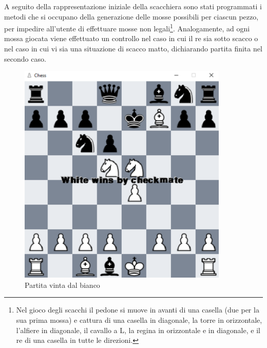 \newpage

A seguito della rappresentazione iniziale della scacchiera sono stati programmati i metodi che si occupano della generazione delle mosse possibili per ciascun pezzo, per impedire all'utente di effettuare mosse non legali\footnote{Nel gioco degli scacchi il pedone si muove in avanti di una casella (due per la sua prima mossa) e cattura di una casella in diagonale, la torre in orizzontale, l'alfiere in diagonale, il cavallo a L, la regina in orizzontale e in diagonale, e il re di una casella in tutte le direzioni.}. Analogamente, ad ogni mossa giocata viene effettuato un controllo nel caso in cui il re sia sotto scacco o nel caso in cui vi sia una situazione di scacco matto, dichiarando partita finita nel secondo caso.
\begin{figure}[!htb]
    \includegraphics[width=10cm]{frontmatter/figure/checkmate.pdf}
    \centering
    \caption{Partita vinta dal bianco}
    \label{fig:checkmate}
\end{figure}


